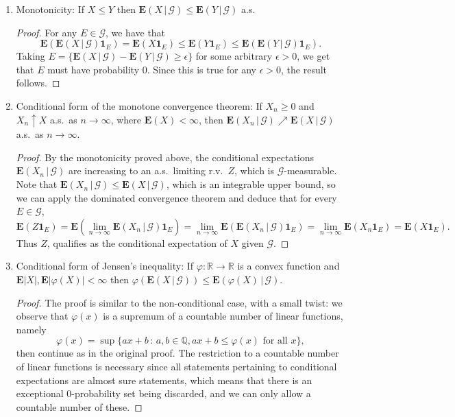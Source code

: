 \documentclass[12pt]{article}
\newcommand{\R}{\mathbb{R}}
\newcommand{\expec}{\mathbf{E}}
\newcommand{\condexp}[2]{\expec\left(#1\,|\,#2\right)}
\newcommand{\ind}{\textbf{1}}
\theoremstyle{example}
\begin{document}
\begin{enumerate}
\item Monotonicity: If $X\le Y$ then $\condexp{X}{\mathcal{G}}\le\condexp{Y}{\mathcal{G}}$ a.s.

\begin{proof}
For any $E\in\mathcal{G}$, we have that
$$ \expec(\condexp{X}{\mathcal{G}}\ind_E) = \expec(X\ind_E) \le
\expec(Y\ind_E) \le \expec(\condexp{Y}{\mathcal{G}}\ind_E). $$
Taking $E=\{\condexp{X}{\mathcal{G}}-\condexp{Y}{\mathcal{G}}\ge \epsilon\}$ for some arbitrary $\epsilon>0$, we get that $E$ must have probability $0$. Since this is true for any $\epsilon>0$, the result follows.
\end{proof}


\item Conditional form of the monotone convergence theorem: If $X_n\ge 0$ and $X_n \uparrow X$ a.s.\ as $n\to\infty$, where $\expec(X)<\infty$, then $\condexp{X_n}{\mathcal{G}}\nearrow \condexp{X}{\mathcal{G}}$ a.s.\ as $n\to\infty$.

\begin{proof}
By the monotonicity proved above, the conditional expectations $\condexp{X_n}{\mathcal{G}}$ are increasing to an a.s.\ limiting r.v.\ $Z$, which is $\mathcal{G}$-measurable. Note that $\condexp{X_n}{\mathcal{G}}\le \condexp{X}{\mathcal{G}}$, which is an integrable upper bound, so we can apply the dominated convergence theorem and deduce that for every $E\in \mathcal{G}$,
$$ \expec(Z\ind_E) = \expec(\lim_{n\to\infty} \condexp{X_n}{\mathcal{G}}\ind_E)
= \lim_{n\to\infty} \expec(\condexp{X_n}{\mathcal{G}}\ind_E) = \lim_{n\to\infty} \expec(X_n\ind_E)
= \expec(X\ind_E). 
$$
Thus $Z$, qualifies as the conditional expectation of $X$ given $\mathcal{G}$.
\end{proof}


\item Conditional form of Jensen's inequality: If $\varphi:\R\to\R$ is a convex function and $\expec|X|, \expec|\varphi(X)|<\infty$ then
$ \varphi(\condexp{X}{\mathcal{G}}) \le \condexp{\varphi(X)}{\mathcal{G}}. $

\begin{proof} The proof is similar to the non-conditional case, with a small twist: we observe that $\varphi(x)$ is a supremum of a countable number of linear functions, namely
$$ \varphi(x) = \sup \{ ax+b\,:\,a,b\in \mathbb{Q}, ax+b\le \varphi(x)\textrm{ for all }x\}, $$
then continue as in the original proof. The restriction to a countable number of linear functions is necessary since all statements pertaining to conditional expectations are almost sure statements, which means that there is an exceptional $0$-probability set being discarded, and we can only allow a countable number of these.
\end{proof}


\end{enumerate}
\end{document}

